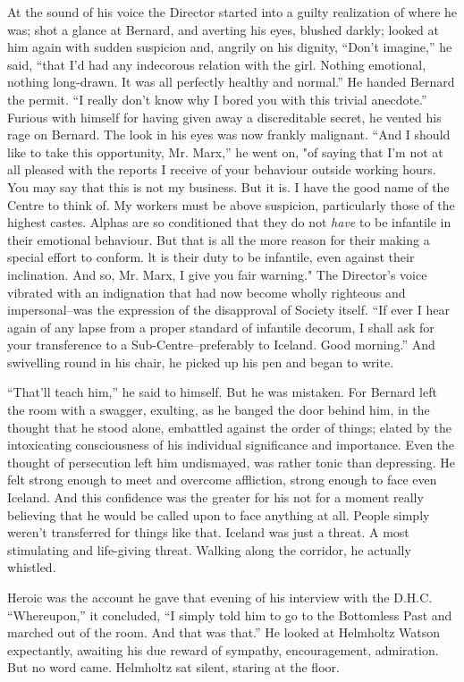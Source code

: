 \documentclass[12pt]{report}
\begin{document}
At the sound of his voice the Director started into a guilty realization
of where he was; shot a glance at Bernard, and averting his eyes,
blushed darkly; looked at him again with sudden suspicion and, angrily
on his dignity, ``Don't imagine,'' he said, ``that I'd had any
indecorous relation with the girl. Nothing emotional, nothing
long-drawn. It was all perfectly healthy and normal.'' He handed Bernard
the permit. ``I really don't know why I bored you with this trivial
anecdote.'' Furious with himself for having given away a discreditable
secret, he vented his rage on Bernard. The look in his eyes was now
frankly malignant. ``And I should like to take this opportunity, Mr.
Marx,'' he went on, "of saying that I'm not at all pleased with the
reports I receive of your behaviour outside working hours. You may say
that this is not my business. But it is. I have the good name of the
Centre to think of. My workers must be above suspicion, particularly
those of the highest castes. Alphas are so conditioned that they do not
\emph{have} to be infantile in their emotional behaviour. But that is
all the more reason for their making a special effort to conform. lt is
their duty to be infantile, even against their inclination. And so, Mr.
Marx, I give you fair warning." The Director's voice vibrated with an
indignation that had now become wholly righteous and impersonal--was the
expression of the disapproval of Society itself. ``If ever I hear again
of any lapse from a proper standard of infantile decorum, I shall ask
for your transference to a Sub-Centre--preferably to Iceland. Good
morning.'' And swivelling round in his chair, he picked up his pen and
began to write.

``That'll teach him,'' he said to himself. But he was mistaken. For
Bernard left the room with a swagger, exulting, as he banged the door
behind him, in the thought that he stood alone, embattled against the
order of things; elated by the intoxicating consciousness of his
individual significance and importance. Even the thought of persecution
left him undismayed, was rather tonic than depressing. He felt strong
enough to meet and overcome affliction, strong enough to face even
Iceland. And this confidence was the greater for his not for a moment
really believing that he would be called upon to face anything at all.
People simply weren't transferred for things like that. Iceland was just
a threat. A most stimulating and life-giving threat. Walking along the
corridor, he actually whistled.

Heroic was the account he gave that evening of his interview with the
D.H.C. ``Whereupon,'' it concluded, ``I simply told him to go to the
Bottomless Past and marched out of the room. And that was that.'' He
looked at Helmholtz Watson expectantly, awaiting his due reward of
sympathy, encouragement, admiration. But no word came. Helmholtz sat
silent, staring at the floor.
\end{document}
